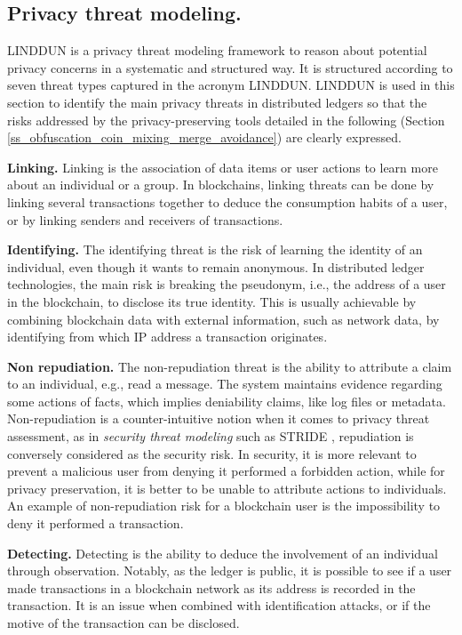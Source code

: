 \subsection{Privacy threat modeling.}
\label{ss_privacy_threat_modeling}
LINDDUN is a privacy threat modeling framework \cite{Wuyts2015} to reason about potential privacy concerns in 
a systematic and structured way. It is structured according to seven threat types captured in the 
acronym LINDDUN. LINDDUN is used in this section to identify the main privacy threats in distributed ledgers 
so that the risks addressed by the privacy-preserving tools detailed in the following (Section \ref{ss_obfuscation_coin_mixing_merge_avoidance})
are clearly expressed.

\textbf{Linking.} Linking is the association of data items or user actions to learn more about an 
individual or a group. In blockchains, linking threats can be done by linking several transactions 
together to deduce the consumption habits of a user, or by linking senders and receivers of transactions.

\textbf{Identifying.} The identifying threat is the risk of learning the identity of an individual, even though 
it wants to remain anonymous. In distributed ledger technologies, the main risk is breaking the pseudonym, i.e., the 
address of a user in the blockchain, to disclose its true identity. This is usually achievable 
by combining blockchain data with external information, such as network data, by identifying 
from which IP address a transaction originates.

\textbf{Non repudiation.} The non-repudiation threat is the ability to attribute a claim to an individual, e.g., read a message. 
The system maintains evidence regarding some actions of facts, which implies deniability claims, like log files or metadata. 
Non-repudiation is a counter-intuitive notion when it comes to privacy threat assessment, as 
in \emph{security threat modeling} such as STRIDE \cite{Howard2006}, repudiation is conversely 
considered as the security risk. In security, it is more relevant to prevent a malicious user 
from denying it performed a forbidden action, while for privacy preservation, it is better 
to be unable to attribute actions to individuals. An example of non-repudiation risk 
for a blockchain user is the impossibility to deny it performed a transaction.

\textbf{Detecting.} Detecting is the ability to deduce the involvement of an individual through observation. 
Notably, as the ledger is public, it is possible to see if a user made transactions in a blockchain 
network as its address is recorded in the transaction. It is an issue when combined 
with identification attacks, or if the motive of the transaction can be disclosed.

